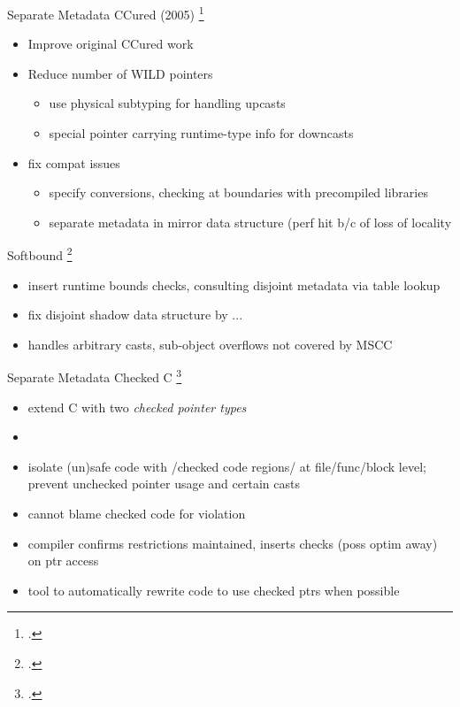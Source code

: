 \documentclass[aspectratio=169]{beamer}
\begin{document}
\begin{frame}{Separate Metadata}
CCured (2005) \footcite{necula_ccured:_2005}
    \begin{itemize}
        \item Improve original CCured work
        \item Reduce number of WILD pointers
            \begin{itemize}
                \item use physical subtyping for handling upcasts
                \item special pointer carrying runtime-type info for downcasts
            \end{itemize}
        \item fix compat issues
            \begin{itemize}
                \item specify conversions, checking at boundaries with precompiled libraries
                \item separate metadata in mirror data structure (perf hit b/c of loss of locality
            \end{itemize}
    \end{itemize}
Softbound \footcite{nagarakatte_softbound:_2009}
    \begin{itemize}
        \item {insert runtime bounds checks, consulting disjoint metadata via table lookup}
        \item {fix disjoint shadow data structure by ...}
        \item handles arbitrary casts, sub-object overflows not covered by MSCC
    \end{itemize}
\end{frame}

\begin{frame}{Separate Metadata}
Checked C \footcite{ruef_checked_2017}
    \begin{itemize}
        \item extend C with two \emph{checked pointer types}
        \item {}
        \item isolate (un)safe code with /checked code regions/ at file/func/block level; prevent unchecked pointer usage and certain casts
        \item cannot blame checked code for violation
        \item compiler confirms restrictions maintained, inserts checks (poss optim away) on ptr access
        \item tool to automatically rewrite code to use checked ptrs when possible
    \end{itemize}
\end{frame}
\end{document}
